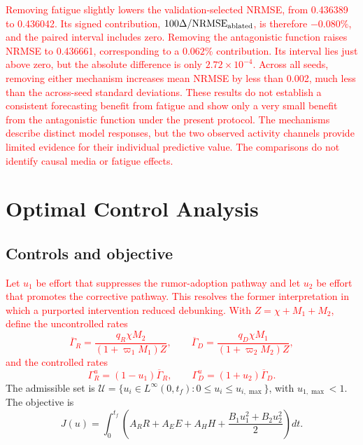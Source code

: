 \documentclass[letterpaper,journal]{IEEEtran}
\begin{document}
	\textcolor{red}{
		Removing fatigue slightly lowers the validation-selected NRMSE, from 0.436389 to 0.436042. Its signed contribution, $100\Delta/{\rm NRMSE}_{\rm ablated}$, is therefore $-0.080\%$, and the paired interval includes zero. Removing the antagonistic function raises NRMSE to 0.436661, corresponding to a $0.062\%$ contribution. Its interval lies just above zero, but the absolute difference is only $2.72\times10^{-4}$. Across all seeds, removing either mechanism increases mean NRMSE by less than 0.002, much less than the across-seed standard deviations. These results do not establish a consistent forecasting benefit from fatigue and show only a very small benefit from the antagonistic function under the present protocol. The mechanisms describe distinct model responses, but the two observed activity channels provide limited evidence for their individual predictive value. The comparisons do not identify causal media or fatigue effects.
	}

	\section{Optimal Control Analysis}
	\label{sec4}

	\subsection{Controls and objective}
	\textcolor{red}{
	Let $u_1$ be effort that suppresses the rumor-adoption pathway and let $u_2$ be effort that promotes the corrective pathway. This resolves the former interpretation in which a purported intervention reduced debunking. With $Z=\chi+M_1+M_2$, define the uncontrolled rates
	\begin{equation*}
	\overline\Gamma_R=\frac{q_R\chi M_2}{(1+\varpi_1M_1)Z},\qquad
	\overline\Gamma_D=\frac{q_D\chi M_1}{(1+\varpi_2M_2)Z},
	\end{equation*}
	and the controlled rates}
	\textcolor{red}{
	\begin{equation}
	\Gamma_R^u=(1-u_1)\overline\Gamma_R,\qquad
	\Gamma_D^u=(1+u_2)\overline\Gamma_D.
	\label{control_functions}
	\end{equation}}
	The admissible set is $\mathcal U=\{u_i\in L^\infty(0,t_f):0\leq u_i\leq u_{i,\max}\}$, with $u_{1,\max}<1$. The objective is
	\begin{equation}
	J(u)=\int_0^{t_f}\left(A_RR+A_EE+A_HH+\frac{B_1u_1^2+B_2u_2^2}{2}\right)dt.
	\label{obj_func}
	\end{equation}
\end{document}

